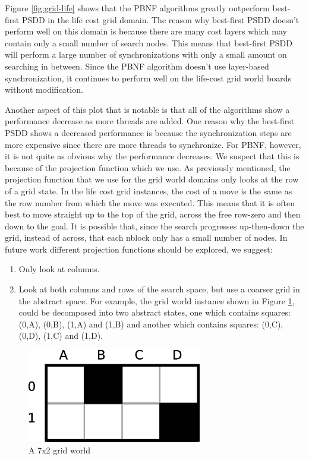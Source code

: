 \documentclass{article}
\begin{document}
 Figure \ref{fig:grid-life} shows that the PBNF algorithms greatly
 outperform best-first PSDD in the life cost grid domain.  The reason
 why best-first PSDD doesn't perform well on this domain is because
 there are many cost layers which may contain only a small number of
 search nodes.  This means that best-first PSDD will perform a large
 number of synchronizations with only a small amount on searching
 in between.  Since the PBNF algorithm doesn't use layer-based
 synchronization, it continues to perform well on the life-cost grid
 world boards without modification.

 Another aspect of this plot that is notable is that all of the
 algorithms show a performance decrease as more threads are added.  One
 reason why the best-first PSDD shows a decreased performance is
 because the synchronization steps are more expensive since there are
 more threads to synchronize.  For PBNF, however, it is not quite as
 obvious why the performance decreases.  We suspect that this is
 because of the projection function which we use.  As previously
 mentioned, the projection function that we use for the grid world
 domains only looks at the row of a grid state.  In the life cost grid
 instances, the cost of a move is the same as the row number from which
 the move was executed.  This means that it is often best to move
 straight up to the top of the grid, across the free row-zero and then
 down to the goal.  It is possible that, since the search progresses
 up-then-down the grid, instead of across, that each nblock only has a
 small number of nodes.  In future work different projection functions
 should be explored, we suggest:
 \begin{enumerate}
 \item Only look at columns.
 \item Look at both columns and rows of the search space, but use a
   coarser grid in the abstract space.  For example, the grid world
   instance shown in Figure \ref{fig:small-grid}, could be decomposed
   into two abstract states, one which contains squares: (0,A), (0,B),
   (1,A) and (1,B) and another which contains squares: (0,C), (0,D),
   (1,C) and (1,D).
 \end{enumerate}

 \begin{figure}[t]
 \begin{center}
 \includegraphics[width=3in]{images/grid-world-small.eps}
 \caption{A 7x2 grid world}
 \label{fig:small-grid}
 \end{center}
 \end{figure}
\end{document}
